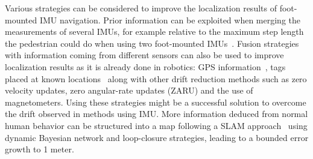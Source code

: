 Various strategies can be considered to improve the localization results of foot-mounted IMU navigation.
Prior information can be exploited when merging the measurements of several IMUs, for example relative to the maximum step length the pedestrian could do when using two foot-mounted IMUs~\cite{skog2012fusing}.
Fusion strategies with information coming from different sensors can also be used to improve localization results as it is already done
 in robotics: GPS information~\cite{hide2012investigating},
  tags placed at known locations~\cite{ruiz2012accurate} along with other drift reduction methods such as zero velocity updates, zero angular-rate updates (ZARU) and the use of magnetometers.
Using these strategies might be a successful solution to overcome the drift observed in methods using IMU.%
 More information deduced from normal human behavior can be structured into a map following a SLAM approach~\cite{angermann2012footslam} using dynamic Bayesian network and loop-closure strategies, leading to a bounded error growth to 1 meter.
